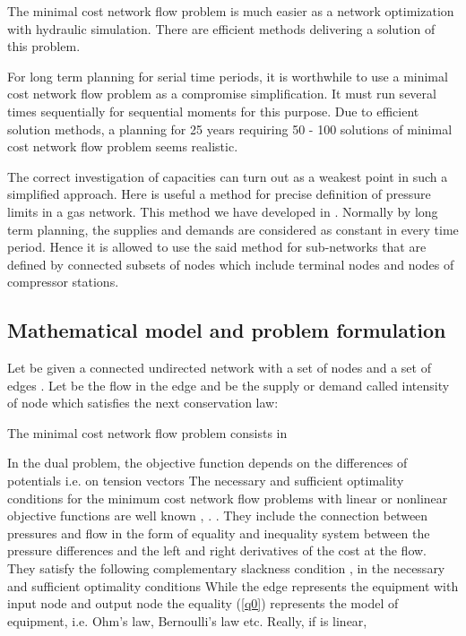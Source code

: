\documentclass{article}
\begin{document}
The minimal cost network flow problem is much easier as a network
optimization with hydraulic simulation. There are efficient methods
delivering a solution of this problem.

For long term planning for serial time periods, it is worthwhile to use a
minimal cost network flow problem as a compromise simplification. It must
run several times sequentially for sequential moments for this purpose. Due
to efficient solution methods, a planning for 25 years requiring 50 - 100
solutions of minimal cost network flow problem seems realistic.

The correct investigation of capacities can turn out as a weakest point in
such a simplified approach. Here is useful a method for precise definition
of pressure limits in a gas network. This method we have developed in \cite {9 0-93}. Normally by long term planning, the supplies and demands are
considered as constant in every time period. Hence it is allowed to use the
said method for sub-networks that are defined by connected subsets of nodes
which include terminal nodes and nodes of compressor stations.

\subsection{Mathematical model and problem formulation}

Let be given a connected undirected network  with a set of nodes 
and a set of edges . Let  be the flow in the edge  and  be the supply or demand called intensity of node  which satisfies
the next conservation law:





The minimal cost network flow problem consists in 


In the dual problem, the objective function depends on the differences of
potentials  i.e. on tension vectors  The
necessary and sufficient optimality conditions for the minimum cost network
flow problems with linear or nonlinear objective functions are well known 
\cite{3 Himmelblau-72}, \cite{10 Murtagh-85}. . They include the connection
between pressures  and flow  in the form of equality
and inequality system between the pressure differences and the left and
right derivatives of the cost at the flow. They satisfy the following
complementary slackness condition \cite{EM-68}, \cite{ZM-86} in the
necessary and sufficient optimality conditions 
While the edge  represents the equipment with input node  and
output node  the equality (\ref{q0}) 
represents the model of equipment, i.e. Ohm's law, Bernoulli's law etc.
Really, if  is linear,
\end{document}
